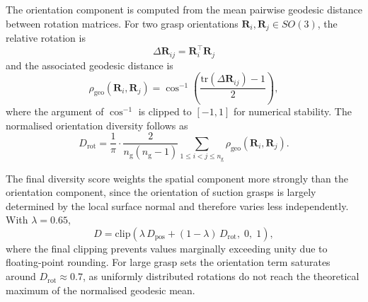 \begin{enumerate}
The orientation component is computed from the mean pairwise geodesic distance between rotation
matrices. For two grasp orientations $\mathbf{R}_i, \mathbf{R}_j \in SO(3)$, the relative rotation is
\begin{equation}
    \Delta \mathbf{R}_{ij} = \mathbf{R}_i^\top \mathbf{R}_j
\end{equation}
and the associated geodesic distance is
\begin{equation}
    \rho_{\mathrm{geo}}(\mathbf{R}_i,\mathbf{R}_j)
    = \cos^{-1}\!\left(
        \frac{\mathrm{tr}(\Delta \mathbf{R}_{ij}) - 1}{2}
    \right),
\end{equation}
where the argument of $\cos^{-1}$ is clipped to $[-1,1]$ for numerical stability. The normalised
orientation diversity follows as
\begin{equation}
    D_{\mathrm{rot}} =
    \frac{1}{\pi} \cdot
    \frac{2}{n_{\mathrm{g}}(n_{\mathrm{g}}-1)}
    \sum_{1 \leq i < j \leq n_{\mathrm{g}}}
    \rho_{\mathrm{geo}}(\mathbf{R}_i,\mathbf{R}_j).
\end{equation}

The final diversity score weights the spatial component more strongly than the orientation
component, since the orientation of suction grasps is largely determined by the local surface normal
and therefore varies less independently. With $\lambda = 0.65$,
\begin{equation}
    D =
    \mathrm{clip}\!\left(
        \lambda\, D_{\mathrm{pos}} +
        (1-\lambda)\, D_{\mathrm{rot}},
        \; 0, \; 1
    \right),
\end{equation}
where the final clipping prevents values marginally exceeding unity due to floating-point rounding.
For large grasp sets the orientation term saturates around $D_{\mathrm{rot}} \approx 0.7$, as
uniformly distributed rotations do not reach the theoretical maximum of the normalised geodesic
mean.


\end{enumerate}
